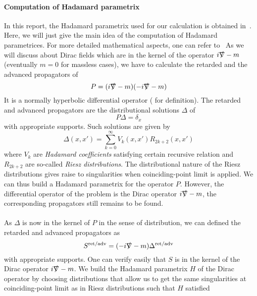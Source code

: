 \paragraph{Computation of Hadamard parametrix}
In this report, the Hadamard parametrix used for our calculation is obtained in~\cite{Zahn2015}. 
Here, we will just give the main idea of the computation of Hadamard parametrices. 
For more detailed mathematical aspects, one can refer to~\cite{Bar2008}
As we will discuss about Dirac fields which are in the kernel of the operator $i\slashed{\nabla} - m$ (eventually $m=0$ for massless cases), 
we have to calculate the retarded and the advanced propagators of 
\begin{equation*}
P = (i\slashed{\nabla} - m)(-i\slashed{\nabla} -m) 
\end{equation*}
It is a normally hyperbolic differential operator (\cite{Bar2008} for definition).
The retarded and advanced propagators are the distributional solutions $\Delta$ of
\begin{equation*} 
P\Delta = \delta_x
\end{equation*}
with appropriate supports.
Such solutions are given by 
\begin{equation*}
\Delta(x,x') = \sum_{k=0}^\infty V_k(x,x') R_{2k+2}(x,x')
\end{equation*} 
where $V_k$ are \textit{Hadamard coefficients} satisfying certain recursive relation and $R_{2k+2}$ are so-called \textit{Riesz distributions}.
The distributional nature of the Riesz distributions gives raise to singularities when coinciding-point limit is applied. 
We can thus build a Hadamard parametrix for the operator $P$.
However, the differential operator of the problem is the Dirac operator $i\slashed{\nabla} -m$,
the corresponding propagators still remains to be found. \\\\
%
As $\Delta$ is now in the kernel of $P$ in the sense of distribution, 
we can defined the retarded and advanced propagators as 
\begin{equation*}
S^{\textrm{ret/adv}} = (-i\slashed{\nabla} - m)\Delta^{\textrm{ret/adv}} 
\end{equation*}
with appropriate supports.
One can verify easily that $S$ is in the kernel of the Dirac operator $i\slashed{\nabla} - m$.
We build the Hadamard parametrix $H$ of the Dirac operator by choosing distributions that allow us to get the same singularities at coinciding-point limit as in Riesz distributions such that $H$ satisfied
